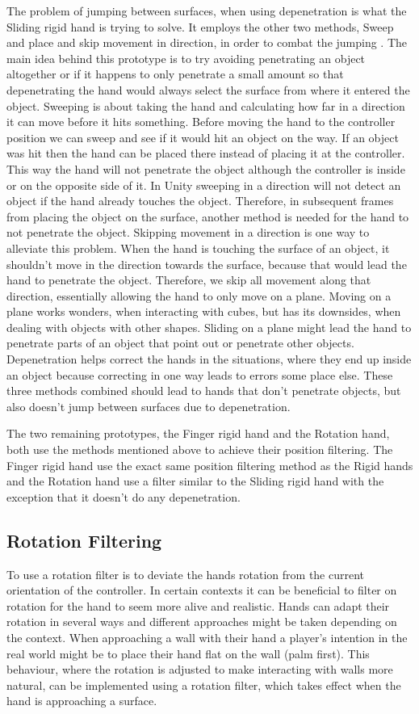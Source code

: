 The problem of jumping between surfaces, when using depenetration is what the Sliding rigid hand is trying to solve. It employs the other two methods, Sweep and place and skip movement in direction, in order to combat the jumping . The main idea behind this prototype is to try avoiding penetrating an object altogether or if it happens to only penetrate a small amount so that depenetrating the hand would always select the surface from where it entered the object. Sweeping is about taking the hand and calculating how far in a direction it can move before it hits something. Before moving the hand to the controller position we can sweep and see if it would hit an object on the way. If an object was hit then the hand can be placed there instead of placing it at the controller. This way the hand will not penetrate the object although the controller is inside or on the opposite side of it. In Unity sweeping in a direction will not detect an object if the hand already touches the object. Therefore, in subsequent frames from placing the object on the surface, another method is needed for the hand to not penetrate the object. Skipping movement in a direction is one way to alleviate this problem. When the hand is touching the surface of an object, it shouldn't move in the direction towards the surface, because that would lead the hand to penetrate the object. Therefore, we skip all movement along that direction, essentially allowing the hand to only move on a plane. Moving on a plane works wonders, when interacting with cubes, but has its downsides, when dealing with objects with other shapes. Sliding on a plane might lead the hand to penetrate parts of an object that point out or penetrate other objects. Depenetration helps correct the hands in the situations, where they end up inside an object because correcting in one way leads to errors some place else. These three methods combined should lead to hands that don't penetrate objects, but also doesn't jump between surfaces due to depenetration.

The two remaining prototypes, the Finger rigid hand and the Rotation hand, both use the methods mentioned above to achieve their position filtering. The Finger rigid hand use the exact same position filtering method as the Rigid hands and the Rotation hand use a filter similar to the Sliding rigid hand with the exception that it doesn't do any depenetration.

\subsection{Rotation Filtering}
\label{subsec:categoryRotationFiltering}
To use a rotation filter is to deviate the hands rotation from the current orientation of the controller. In certain contexts it can be beneficial to filter on rotation for the hand to seem more alive and realistic. Hands can adapt their rotation in several ways and different approaches might be taken depending on the context. When approaching a wall with their hand a player's intention in the real world might be to place their hand flat on the wall (palm first). This behaviour, where the rotation is adjusted to make interacting with walls more natural, can be implemented using a rotation filter, which takes effect when the hand is approaching a surface.


